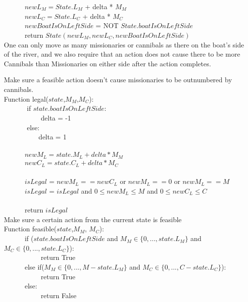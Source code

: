 \documentclass{article}
\begin{document}
\noindent    
\verb|      |$newL_M = State.L_M$ + delta * $M_M$\\
\verb|      |$newL_C = State.L_C$ + delta * $M_C$\\
\verb|      |$newBoatIsOnLeftSide$ = NOT $State.boatIsOnLeftSide$\\

\verb|      |return $State(newL_M, newL_C, newBoatIsOnLeftSide)$\\
    
\noindent    
One can only move as many missionaries or cannibals as there on the boat's side of the river, and we also require that an action does not cause there to be more Cannibals than Missionaries on either side after the action completes.\\
\hfill \break
\noindent

Make sure a feasible action doesn't cause missionaries to be outnumbered by cannibals.\\
\verb|| Function legal($state$,$M_M$,$M_C$):\\
\verb|      | if $state.boatIsOnLeftSide$:\\
\verb|          | delta = -1\\
\verb|      | else:\\
\verb|          |delta = 1\\\\
\verb|      | $newM_L=state.M_L + delta*M_M$\\
\verb|      | $newC_L= state.C_L + delta*M_C$\\\\
\verb|      | $isLegal$ = $newM_L == newC_L$ or $newM_L == 0$ or $newM_L == M$\\
\verb|      | $isLegal$ = $isLegal$ and $0 \leq newM_L \leq M$ and $0 \leq newC_L \leq C$\\\\
\verb|      |return  $isLegal$\\


Make sure a certain action from the current state is feasible\\
\verb|| Function feasible($state$,$M_M$, $M_C$): \\
\verb|      |if ($state.boatIsOnLeftSide$ and $M_M \in \{ 0, ... ,  state.L_M\}$ and $M_C \in \{ 0, ... ,  state.L_C\}$):\\
\verb|          | return True\\
\verb|      |else if($M_M \in \{ 0, ... ,  M-state.L_M\}$ and $M_C \in \{ 0, ... ,  C-state.L_C\}$):\\
\verb|          | return True\\
\verb|      |else:\\
\verb|          | return False\\
\end{document}
